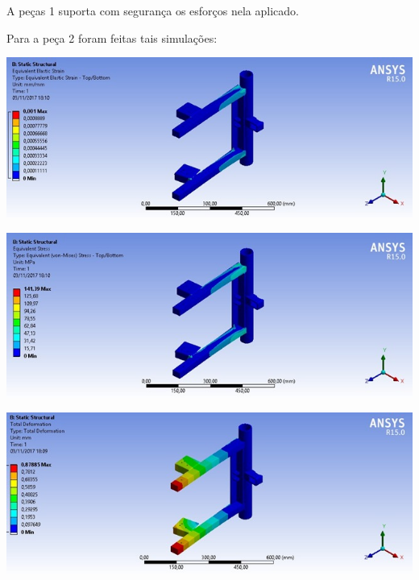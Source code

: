     A peças 1 suporta com segurança os esforços nela aplicado.
 
    Para a peça 2 foram feitas tais simulações:
 

    \begin{center}
    	\includegraphics[scale=0.7]{figuras/sim_estatica_4}
        \label{sim_estatica_4}
    \end{center}
    
    \begin{center}
    	\includegraphics[scale=0.7]{figuras/stress_4}
        \label{stress_4}
    \end{center}
  
    \begin{center}
    	\includegraphics[scale=0.7]{figuras/deformacao_2}
        \label{deformacao_2}
    \end{center}

